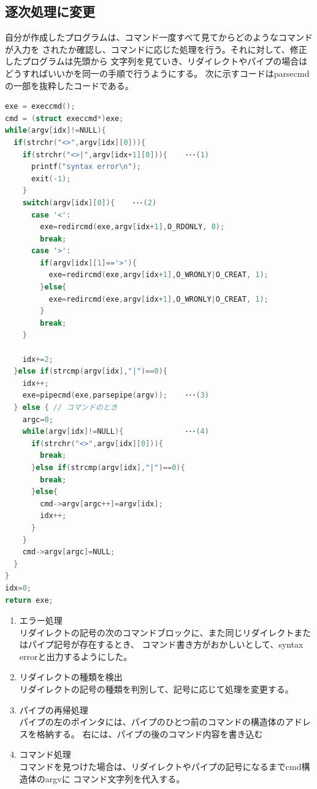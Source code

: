 \documentclass[a4j, twocolumn]{ltjsarticle}
\begin{document}
      \subsection{逐次処理に変更}
      自分が作成したプログラムは、コマンド一度すべて見てからどのようなコマンドが入力を
      されたか確認し、コマンドに応じた処理を行う。それに対して、修正したプログラムは先頭から
      文字列を見ていき、リダイレクトやパイプの場合はどうすればいいかを同一の手順で行うようにする。
      次に示すコードはparsecmdの一部を抜粋したコードである。
      \begin{lstlisting}[language=C,caption=parsecmd一部抜粋]
exe = execcmd();
cmd = (struct execcmd*)exe;
while(argv[idx]!=NULL){
  if(strchr("<>",argv[idx][0])){
    if(strchr("<>|",argv[idx+1][0])){    ･･･(1)
      printf("syntax error\n");
      exit(-1);
    }
    switch(argv[idx][0]){    ･･･(2)
      case '<':
        exe=redircmd(exe,argv[idx+1],O_RDONLY, 0);
        break;
      case '>':
        if(argv[idx][1]=='>'){
          exe=redircmd(exe,argv[idx+1],O_WRONLY|O_CREAT, 1);
        }else{
          exe=redircmd(exe,argv[idx+1],O_WRONLY|O_CREAT, 1);
        }
        break;
    }
    
    idx+=2;
  }else if(strcmp(argv[idx],"|")==0){
    idx++;
    exe=pipecmd(exe,parsepipe(argv));    ･･･(3)
  } else { // コマンドのとき
    argc=0;
    while(argv[idx]!=NULL){              ･･･(4)
      if(strchr("<>",argv[idx][0])){
        break;
      }else if(strcmp(argv[idx],"|")==0){
        break;
      }else{
        cmd->argv[argc++]=argv[idx];
        idx++;
      }
    }
    cmd->argv[argc]=NULL;
  }
}
idx=0;
return exe;
      \end{lstlisting}
      \begin{enumerate}
        \item エラー処理
        \\ \indent リダイレクトの記号の次のコマンドブロックに、また同じリダイレクトまたはパイプ記号が存在するとき、
        コマンド書き方がおかしいとして、syntax errorと出力するようにした。
        \item リダイレクトの種類を検出
        \\ \indent リダイレクトの記号の種類を判別して、記号に応じて処理を変更する。
        \item パイプの再帰処理
        \\ \indent パイプの左のポインタには、パイプのひとつ前のコマンドの構造体のアドレスを格納する。
        右には、パイプの後のコマンド内容を書き込む
        \item コマンド処理
        \\ \indent コマンドを見つけた場合は、リダイレクトやパイプの記号になるまでcmd構造体のargvに
        コマンド文字列を代入する。
      \end{enumerate}
\end{document}
